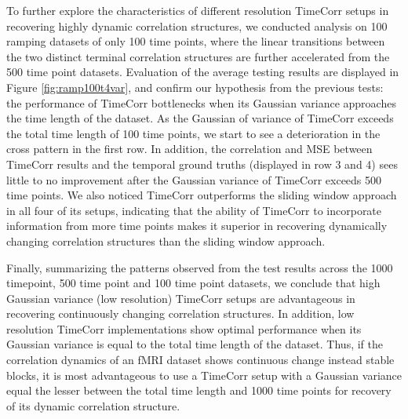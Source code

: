 \documentclass[11pt]{article}
\begin{document}
To further explore the characteristics of different resolution TimeCorr setups in recovering highly dynamic correlation structures, we conducted analysis on 100 ramping datasets of only 100 time points, where the linear transitions between the two distinct terminal correlation structures are further accelerated from the 500 time point datasets. Evaluation of the average testing results are displayed in Figure \ref{fig:ramp100t4var}, and confirm our hypothesis from the previous tests: the performance of TimeCorr bottlenecks when its Gaussian variance approaches the time length of the dataset. As the Gaussian of variance of TimeCorr exceeds the total time length of 100 time points, we start to see a deterioration in the cross pattern in the first row. In addition, the correlation and MSE between TimeCorr results and the temporal ground truths (displayed in row 3 and 4) sees little to no improvement after the Gaussian variance of TimeCorr exceeds 500 time points. We also noticed TimeCorr outperforms the sliding window approach in all four of its setups, indicating that the ability of TimeCorr to incorporate information from more time points makes it superior in recovering dynamically changing correlation structures than the sliding window approach.

Finally, summarizing the patterns observed from the test results across the 1000 timepoint, 500 time point and 100 time point datasets, we conclude that high Gaussian variance (low resolution) TimeCorr setups are advantageous in recovering continuously changing correlation structures. In addition, low resolution TimeCorr implementations show optimal performance when its Gaussian variance is equal to the total time length of the dataset. Thus, if the correlation dynamics of an fMRI dataset shows continuous change instead stable blocks, it is most advantageous to use a TimeCorr setup with a Gaussian variance equal the lesser between the total time length and 1000 time points for recovery of its dynamic correlation structure.
\end{document}
